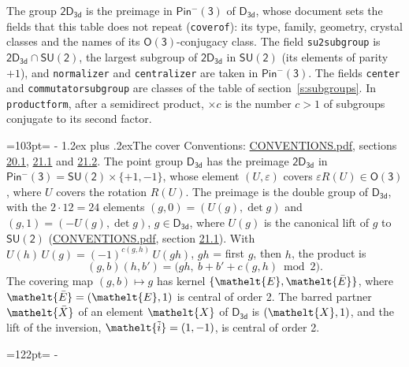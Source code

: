 \documentclass[10pt,a4paper]{article}
\makeatletter
\renewcommand\section{\@startsection{section}{1}{\z@}{-3ex plus -1ex minus -.2ex}%
  {1.2ex plus .2ex}{\normalfont\large\sffamily\bfseries\color{parttitle}}}
\newcommand{\needspace}[1]{\par\penalty-100\begingroup\dimen0=#1\relax\dimen2=\pagegoal
  \advance\dimen2-\pagetotal\ifdim\dimen0>\dimen2\relax\ifdim\dimen2>0pt\vfil\break\fi\fi
  \endgroup}
\numberwithin{equation}{section}
\newcommand{\eltfont}[1]{{\let\sigma\eltsigma\mathelt{#1}}}
\newcommand{\grp}[1]{\mathsf{#1}}
\newcommand{\elt}[1]{\eltfont{#1}}
\newcommand{\dirprod}{\times}
\newcommand{\barred}[1]{\bar{#1}}
\newcommand{\lift}[1]{\tilde{#1}}
\makeatother
\begin{document}
\leavevmode\label{n:element.inversion}\label{n:group.preimage}The group $\grp{2D_{3d}}$ is the preimage in $\grp{Pin^{-}(3)}$ of \href{../../../rotation/data/pdf/D3d.pdf}{$\grp{D_{3d}}$}, whose document sets the fields that this table does not repeat (\texttt{coverof}): its type, family, geometry, crystal classes and the names of its \href{../../../rotation/data/pdf/O3.pdf}{$\grp{O(3)}$}-conjugacy class. The field \texttt{su2subgroup} is $\grp{2D_{3d}} \cap \grp{SU(2)}$, the largest subgroup of $\grp{2D_{3d}}$ in $\grp{SU(2)}$ (its elements of parity $+1$), and \texttt{normalizer} and \texttt{centralizer} are taken in $\grp{Pin^{-}(3)}$. The fields \texttt{center} and \texttt{commutatorsubgroup} are classes of the table of section~\ref{s:subgroups}.
\leavevmode\label{n:index.conjugates.c}In \texttt{productform}, after a semidirect product, ${\times}c$ is the number $c > 1$ of subgroups conjugate to its second factor.
\needspace{103pt}
\section{The cover}\label{s:cover}
Conventions: \href{../../CONVENTIONS.pdf}{CONVENTIONS.pdf}, sections \href{../../CONVENTIONS.pdf\#conv.20.1}{20.1}, \href{../../CONVENTIONS.pdf\#conv.21.1}{21.1} and \href{../../CONVENTIONS.pdf\#conv.21.2}{21.2}.
\leavevmode\label{n:group.pin.minus}\label{n:group.su2}\label{n:local.pin.sign}\label{n:matrix.covered}\label{n:matrix.lift.su2}\label{n:index.bar}The point group $\grp{D_{3d}}$ has the preimage $\grp{2D_{3d}}$ in $\grp{Pin^{-}(3)} = \grp{SU(2)} \dirprod \{+1, -1\}$, whose element $(U, \varepsilon)$ covers $\varepsilon R(U) \in \grp{O(3)}$, where $U$ covers the rotation $R(U)$. The preimage is the double group of $\grp{D_{3d}}$, with the $2 \cdot 12 = 24$ elements $(g, 0) = (U(g), \det g)$ and $(g, 1) = (-U(g), \det g)$, $g \in \grp{D_{3d}}$, where $U(g)$ is the canonical lift of $g$ to $\grp{SU(2)}$ (\href{../../CONVENTIONS.pdf}{CONVENTIONS.pdf}, section \href{../../CONVENTIONS.pdf\#conv.21.1}{21.1}). \label{n:function.cocycle}With $U(h)\,U(g) = (-1)^{c(g,h)}\,U(gh)$, $gh$ = first $g$, then $h$, the product is
\begin{equation}\label{e:product}(g, b)(h, b') = \bigl(gh,\ b + b' + c(g, h) \bmod 2\bigr).\end{equation}
\leavevmode\label{n:mark.bar}The covering map $(g, b) \mapsto g$ has kernel $\{\elt{E}, \elt{\barred{E}}\}$, where $\elt{\barred{E}} = (\elt{E}, 1)$ is central of order 2. \label{n:element.named}\label{n:mark.lift}The barred partner $\elt{\barred{X}}$ of an element $\elt{X}$ of $\grp{D_{3d}}$ is $(\elt{X}, 1)$, and the lift of the inversion, $\elt{\lift{i}} = (1, -1)$, is central of order 2.
\needspace{122pt}
\end{document}
